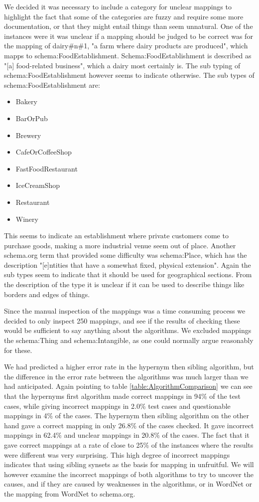 We decided it was necessary to include a category for unclear mappings to highlight the fact that some of the categories
are fuzzy and require some more documentation,
or that they might entail things than seem unnatural.
One of the instances were it was unclear if a mapping should be judged to be correct was for the mapping of dairy\#n\#1,
"a farm where dairy products are produced", which mapps to schema:FoodEstablishment.
Schema:FoodEstablishment is described as "[a] food-related business", which a dairy most certainly is.
The sub typing of schema:FoodEstablishment however seems to indicate otherwise.
The sub types of schema:FoodEstablishment are:
\begin{itemize}
	\item Bakery
	\item BarOrPub
	\item Brewery
	\item CafeOrCoffeeShop
	\item FastFoodRestaurant
	\item IceCreamShop
	\item Restaurant
	\item Winery
\end{itemize}
This seems to indicate an establishment where private customers come to purchase goods,
making a more industrial venue seem out of place.
Another schema.org term that provided some difficulty was schema:Place,
which has the description "[e]ntities that have a somewhat fixed, physical extension".
Again the sub types seem to indicate that it should be used for geographical sections.
From the description of the type it is unclear if it can be used to describe things like borders and edges of things.

Since the manual inspection of the mappings was a time consuming process we decided to only inspect 250 mappings,
and see if the results of checking these would be sufficient to say anything about the algorithms.
We excluded mappings the schema:Thing and schema:Intangible, as one could normally argue reasonably for these.

We had predicted a higher error rate in the hypernym then sibling algorithm,
but the difference in the error rate between the algorithms was much larger than we had anticipated.
Again pointing to table \ref{table:AlgorithmComparison} we can see that the hypernyms first algorithm
made correct mappings in 94\% of the test cases,
while giving incorrect mappings in 2.0\% test cases and questionable mappings in 4\% of the cases.
The hypernym then sibling algorithm on the other hand gave a correct mapping in only 26.8\% of the cases checked.
It gave incorrect mappings in 62.4\% and unclear mappings in 20.8\% of the cases.
The fact that it gave correct mappings at a rate of close to 25\% of the instances where the results were different was very surprising.
This high degree of incorrect mappings indicates that using sibling synsets as the basis for mapping in unfruitful.
We will however examine the incorrect mappings of both algorithms to try to uncover the causes,
and if they are caused by weaknesses in the algorithms, or in WordNet or the mapping from WordNet to schema.org.



